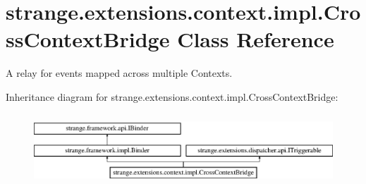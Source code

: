 \hypertarget{classstrange_1_1extensions_1_1context_1_1impl_1_1_cross_context_bridge}{\section{strange.\-extensions.\-context.\-impl.\-Cross\-Context\-Bridge Class Reference}
\label{classstrange_1_1extensions_1_1context_1_1impl_1_1_cross_context_bridge}
}


A relay for events mapped across multiple Contexts.  


Inheritance diagram for strange.\-extensions.\-context.\-impl.\-Cross\-Context\-Bridge\-:\begin{figure}[H]
\begin{center}
\leavevmode
\includegraphics[height=2.700965cm]{classstrange_1_1extensions_1_1context_1_1impl_1_1_cross_context_bridge}
\end{center}
\end{figure}
